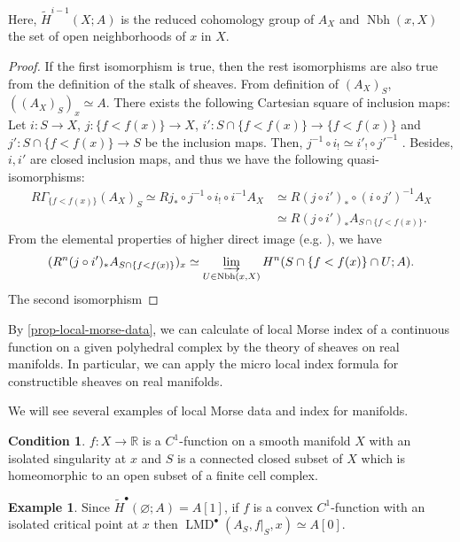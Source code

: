 \documentclass[a4paper,dvipdfmx,reqno,12pt]{amsart}
\theoremstyle{definition}
\newtheorem{example}[theorem]{Example}
\newtheorem{condition}[theorem]{Condition}
\newcommand{\emp}{\varnothing}%
\newcommand{\opn}[1]{\operatorname{#1}}
\numberwithin{equation}{section}
\begin{document}
Here, $\tilde{H}^{i-1}(X;A)$ is the reduced cohomology 
group
of $A_X$ and $\opn{Nbh}(x,X)$ the set of open neighborhoods
of $x$ in $X$. 
\begin{proof}
If the first isomorphism is true, then the rest
isomorphisms are also true from the definition of 
the stalk of sheaves.
From definition of $(A_{X})_S$, 
$((A_{X})_S)_x\simeq A$.
There exists the following Cartesian square of 
inclusion maps:
Let $i\colon S\to X$, 
$j\colon \{f<f(x)\}\to X$, 
$i'\colon S\cap \{f<f(x)\} \to \{f<f(x)\}$ and 
$j'\colon S\cap \{f<f(x)\} \to S$
 be the inclusion maps.
Then, 
$j^{-1}\circ i_!\simeq i'_!\circ j'^{-1}$ 
\cite[Proposition 2.5.11]{MR1299726}.
Besides, $i,i'$ are closed inclusion maps, and thus
we have the following quasi-isomorphisms:
\begin{align}
R\Gamma_{\{f<f(x)\}}(A_{X})_S\simeq 
Rj_*\circ j^{-1} \circ i_! \circ i^{-1}A_X&\simeq 
R (j \circ i')_*\circ (i\circ j')^{-1}A_X \\
&\simeq R (j \circ i')_* A_{S\cap \{f<f(x)\}}.
\end{align}
From the elemental properties of higher direct image
(e.g. \cite[II. Proposition 5.11]{iversenCohomologySheaves1986a}), we have
\begin{align}
  (R^{n} (j \circ i')_* A_{S\cap \{f<f(x)\}})_x\simeq 
\varinjlim_{U\in \opn{Nbh}(x,X)} 
H^{n}(S\cap \{f<f(x)\}\cap U;A).
\end{align}
The second isomorphism 
\end{proof}

By \cref{prop-local-morse-data}, we can calculate
of local Morse index of a continuous function on 
a given polyhedral complex by the theory of sheaves on 
real manifolds. In particular, 
we can apply the micro local index formula 
\cite[Theorem 9.5.6]{MR1299726} for 
constructible sheaves on real manifolds.

We will see several examples of local Morse data 
and index for manifolds.

\begin{condition}
\label{condition-isolated-singularity}
$f\colon X\to \mathbb{R}$ is a $C^{1}$-function on a 
smooth manifold $X$ with an isolated singularity
at $x$ and $S$ is a connected closed subset of $X$ which is homeomorphic to 
an open subset of a finite cell complex. 
\end{condition}

\begin{example}
Since $\tilde{H}^{\bullet}(\emp;A)=A[1]$, 
if $f$ is a convex $C^{1}$-function with an isolated 
critical point at $x$ then
$\opn{LMD}^{\bullet}(A_{S},f|_S,x)\simeq A[0]$.
\end{example}
\end{document}
